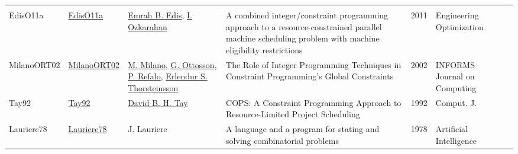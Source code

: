 {\begin{longtable}{p{2cm}p{2cm}p{5cm}p{10cm}rp{3cm}l}
\cite{ZarandiB12}\\EdisO11a & \href{http://dx.doi.org/10.1080/03052151003759117}{EdisO11a} & \hyperref[auth:a352]{Emrah B. Edis}, \hyperref[auth:a354]{I. Ozkarahan} & A combined integer/constraint programming approach to a resource-constrained parallel machine scheduling problem with machine eligibility restrictions & 2011 & Engineering Optimization & \cite{EdisO11a}\\MilanoORT02 & \href{http://dx.doi.org/10.1287/ijoc.14.4.387.2830}{MilanoORT02} & \hyperref[auth:a144]{M. Milano}, \hyperref[auth:a950]{G. Ottosson}, \hyperref[auth:a257]{P. Refalo}, \hyperref[auth:a887]{Erlendur S. Thorsteinsson} & The Role of Integer Programming Techniques in Constraint Programming's Global Constraints & 2002 & INFORMS Journal on Computing & \cite{MilanoORT02}\\Tay92 & \href{}{Tay92} & \hyperref[auth:a711]{David B. H. Tay} & {COPS:} {A} Constraint Programming Approach to Resource-Limited Project Scheduling & 1992 & Comput. J. & \cite{Tay92}\\Lauriere78 & \href{http://dx.doi.org/10.1016/0004-3702(78)90029-2}{Lauriere78} & J. Lauriere & A language and a program for stating and solving combinatorial problems & 1978 & Artificial Intelligence & \cite{Lauriere78}\\\end{longtable}
}

